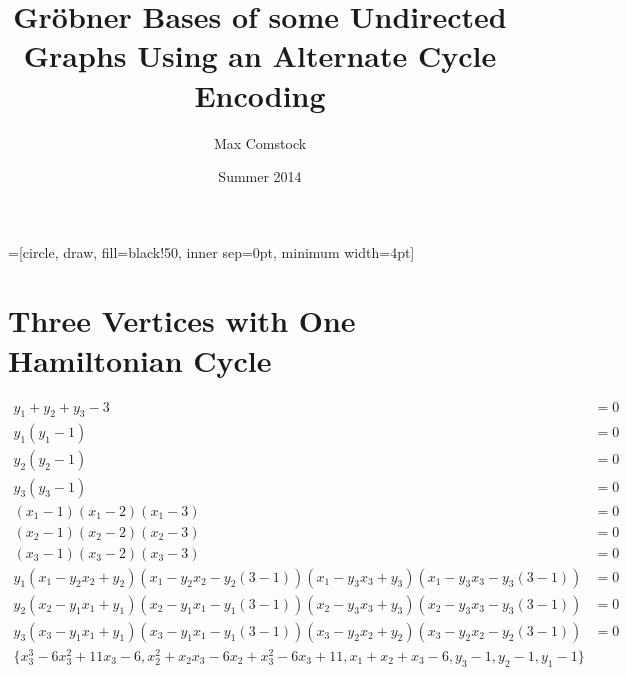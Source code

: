 \documentclass[letterpaper]{article}
\newcommand{\aln}[1]{\begin{align*} #1 \end{align*}} %
\begin{document}
=[circle, draw, fill=black!50, inner sep=0pt, minimum width=4pt]

\title{Gr\"obner Bases of some Undirected Graphs Using an Alternate Cycle Encoding}
\author{Max Comstock}
\date{Summer 2014}
\maketitle

\section{Three Vertices with One Hamiltonian Cycle}

\begin{center}
\end{center}
\aln{
	y_1 + y_2 + y_3 - 3&= 0\\
	y_1(y_1 - 1) &= 0\\
	y_2(y_2 - 1) &= 0\\
	y_3(y_3 - 1) &= 0\\
	(x_1 - 1)(x_1 - 2)(x_1 - 3) &= 0\\
	(x_2 - 1)(x_2 - 2)(x_2 - 3) &= 0\\
	(x_3 - 1)(x_3 - 2)(x_3 - 3) &= 0\\
	y_1 (x_1 - y_2 x_2 + y_2)(x_1 - y_2 x_2 - y_2(3-1))(x_1 - y_3 x_3 + y_3)(x_1 - y_3 x_3 - y_3(3-1)) &= 0\\
	y_2 (x_2 - y_1 x_1 + y_1)(x_2 - y_1 x_1 - y_1(3-1))(x_2 - y_3 x_3 + y_3)(x_2 - y_3 x_3 - y_3(3-1)) &= 0\\
	y_3 (x_3 - y_1 x_1 + y_1)(x_3 - y_1 x_1 - y_1(3-1))(x_3 - y_2 x_2 + y_2)(x_3 - y_2 x_2 - y_2(3-1)) &= 0
}
\aln{
	\{x_3^3-6x_3^2+11x_3-6, x_2^2+x_2x_3-6x_2+x_3^2-6x_3+11, x_1+x_2+x_3-6, y_3-1, y_2-1, y_1-1\}
}


\newpage
\end{document}
